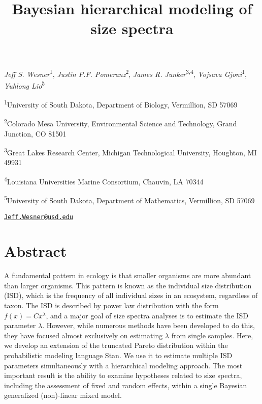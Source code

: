 \documentclass[
  12pt,
]{article}
\title{Bayesian hierarchical modeling of size spectra}
\author{}
\date{\vspace{-2.5em}}
\begin{document}
\maketitle

\emph{Jeff S. Wesner}\textsuperscript{1}, \emph{Justin P.F.
Pomeranz}\textsuperscript{2}, \emph{James R.
Junker}\textsuperscript{3,4}, \emph{Vojsava Gjoni}\textsuperscript{1},
\emph{Yuhlong Lio}\textsuperscript{5}

\textsuperscript{1}University of South Dakota, Department of Biology,
Vermillion, SD 57069

\textsuperscript{2}Colorado Mesa University, Environmental Science and
Technology, Grand Junction, CO 81501

\textsuperscript{3}Great Lakes Research Center, Michigan Technological
University, Houghton, MI 49931

\textsuperscript{4}Louisiana Universities Marine Consortium, Chauvin, LA
70344

\textsuperscript{5}University of South Dakota, Department of
Mathematics, Vermillion, SD 57069

\href{mailto:Jeff.Wesner@usd.edu}{\nolinkurl{Jeff.Wesner@usd.edu}}

\newpage

\hypertarget{abstract}{%
\section{Abstract}\label{abstract}}

A fundamental pattern in ecology is that smaller organisms are more
abundant than larger organisms. This pattern is known as the individual
size distribution (ISD), which is the frequency of all individual sizes
in an ecosystem, regardless of taxon. The ISD is described by power law
distribution with the form \(f(x) = Cx^{\lambda}\), and a major goal of
size spectra analyses is to estimate the ISD parameter \(\lambda\).
However, while numerous methods have been developed to do this, they
have focused almost exclusively on estimating \(\lambda\) from single
samples. Here, we develop an extension of the truncated Pareto
distribution within the probabilistic modeling language Stan. We use it
to estimate multiple ISD parameters simultaneously with a hierarchical
modeling approach. The most important result is the ability to examine
hypotheses related to size spectra, including the assessment of fixed
and random effects, within a single Bayesian generalized (non)-linear
mixed model.
\end{document}
